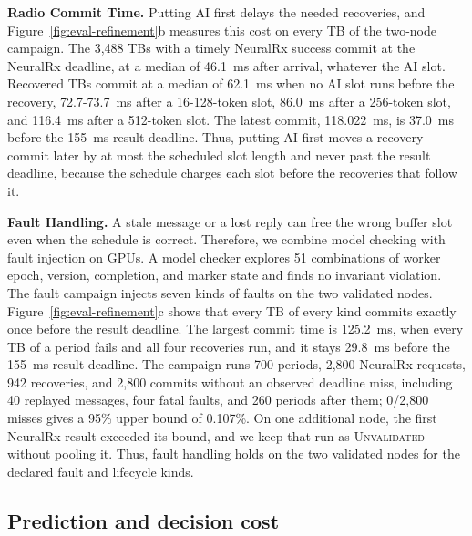 \documentclass[acmsmall,screen,review,anonymous]{acmart}
\newcommand{\UQ}{\textsc{Unvalidated}\xspace}
\newcommand{\NRx}{NeuralRx\xspace}
\begin{document}
\noindent\textbf{Radio Commit Time.}
Putting AI first delays the needed recoveries, and Figure~\ref{fig:eval-refinement}b measures this cost on
every TB of the two-node campaign. The 3,488 TBs with a timely \NRx success commit at the \NRx deadline,
at a median of 46.1~ms after arrival, whatever the AI slot. Recovered TBs commit at a median of 62.1~ms
when no AI slot runs before the recovery, 72.7-73.7~ms after a 16-128-token slot, 86.0~ms after a
256-token slot, and 116.4~ms after a 512-token slot. The latest commit, 118.022~ms, is 37.0~ms before the
155~ms result deadline. Thus, putting AI first moves a recovery commit later by at most the scheduled slot
length and never past the result deadline, because the schedule charges each slot before the recoveries
that follow it.

\noindent\textbf{Fault Handling.}
A stale message or a lost reply can free the wrong buffer slot even when the schedule is correct.
Therefore, we combine model checking with fault injection on GPUs. A model checker explores 51
combinations of worker epoch, version, completion, and marker state and finds no invariant violation. The
fault campaign injects seven kinds of faults on the two validated nodes. Figure~\ref{fig:eval-refinement}c
shows that every TB of every kind commits exactly once before the result deadline. The largest commit time
is 125.2~ms, when every TB of a period fails and all four recoveries run, and it stays 29.8~ms before the
155~ms result deadline. The campaign runs 700 periods, 2,800 \NRx requests, 942 recoveries, and 2,800
commits without an observed deadline miss, including 40 replayed messages, four fatal faults, and 260
periods after them; 0/2,800 misses gives a 95\% upper bound of 0.107\%. On one additional node, the first
\NRx result exceeded its bound, and we keep that run as \UQ without pooling it. Thus, fault handling holds
on the two validated nodes for the declared fault and lifecycle kinds.

\subsection{Prediction and decision cost}
\label{sec:eval-prediction}
\end{document}
